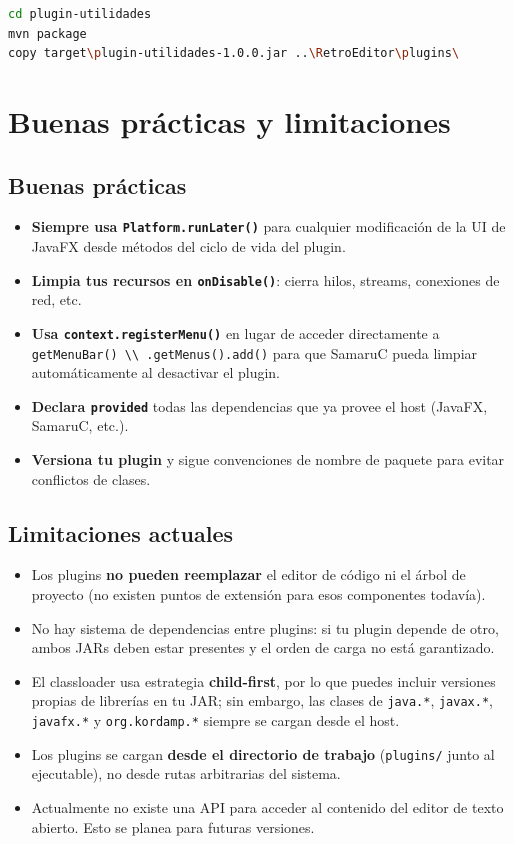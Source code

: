 \documentclass[../../main.tex]{subfiles}
\begin{document}
\begin{lstlisting}[language=bash]
cd plugin-utilidades
mvn package
copy target\plugin-utilidades-1.0.0.jar ..\RetroEditor\plugins\
\end{lstlisting}

\clearpage

\section{Buenas prácticas y limitaciones}

\subsection{Buenas prácticas}

\begin{itemize}
\item \textbf{Siempre usa \lstinline|Platform.runLater()|} para cualquier modificación de la UI de JavaFX desde métodos del ciclo de vida del plugin.
\item \textbf{Limpia tus recursos en \lstinline|onDisable()|}: cierra hilos, streams, conexiones de red, etc.
\item \textbf{Usa \lstinline|context.registerMenu()|} en lugar de acceder directamente a \lstinline|getMenuBar() \\ .getMenus().add()| para que SamaruC pueda limpiar automáticamente al desactivar el plugin.
\item \textbf{Declara \lstinline|provided|} todas las dependencias que ya provee el host (JavaFX, SamaruC, etc.).
\item \textbf{Versiona tu plugin} y sigue convenciones de nombre de paquete para evitar conflictos de clases.
\end{itemize}

\subsection{Limitaciones actuales}

\begin{itemize}
\item Los plugins \textbf{no pueden reemplazar} el editor de código ni el árbol de proyecto (no existen puntos de extensión para esos componentes todavía).
\item No hay sistema de dependencias entre plugins: si tu plugin depende de otro, ambos JARs deben estar presentes y el orden de carga no está garantizado.
\item El classloader usa estrategia \textbf{child-first}, por lo que puedes incluir versiones propias de librerías en tu JAR; sin embargo, las clases de \lstinline|java.*|, \lstinline|javax.*|, \lstinline|javafx.*| y \lstinline|org.kordamp.*| siempre se cargan desde el host.
\item Los plugins se cargan \textbf{desde el directorio de trabajo} (\lstinline|plugins/| junto al ejecutable), no desde rutas arbitrarias del sistema.
\item Actualmente no existe una API para acceder al contenido del editor de texto abierto. Esto se planea para futuras versiones.
\end{itemize}

\vspace{2cm}
\begin{center}

\end{center}
\end{document}
